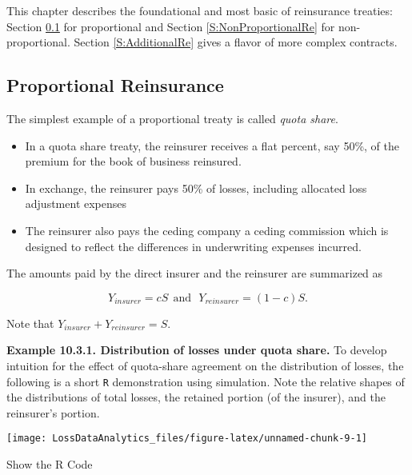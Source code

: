 \documentclass[]{book}
\theoremstyle{definition}
\theoremstyle{definition}
\theoremstyle{definition}
\theoremstyle{remark}
\begin{document}
This chapter describes the foundational and most basic of reinsurance
treaties: Section \ref{S:ProportionalRe} for proportional and Section
\ref{S:NonProportionalRe} for non-proportional. Section
\ref{S:AdditionalRe} gives a flavor of more complex contracts.

\subsection{Proportional Reinsurance}\label{S:ProportionalRe}

The simplest example of a proportional treaty is called \emph{quota
share}.

\begin{itemize}
\item
  In a quota share treaty, the reinsurer receives a flat percent, say
  50\%, of the premium for the book of business reinsured.
\item
  In exchange, the reinsurer pays 50\% of losses, including allocated
  loss adjustment expenses
\item
  The reinsurer also pays the ceding company a ceding commission which
  is designed to reflect the differences in underwriting expenses
  incurred.
\end{itemize}

The amounts paid by the direct insurer and the reinsurer are summarized
as

\[
Y_{insurer} = c S \ \ \text{and} \ \ \ Y_{reinsurer} = (1-c) S.
\]

Note that \(Y_{insurer}+Y_{reinsurer}=S\).

\textbf{Example 10.3.1. Distribution of losses under quota share.} To
develop intuition for the effect of quota-share agreement on the
distribution of losses, the following is a short \texttt{R}
demonstration using simulation. Note the relative shapes of the
distributions of total losses, the retained portion (of the insurer),
and the reinsurer's portion.

\begin{center}\texttt{[image: LossDataAnalytics\_files/figure-latex/unnamed-chunk-9-1]} \end{center}

Show the R Code
\end{document}
